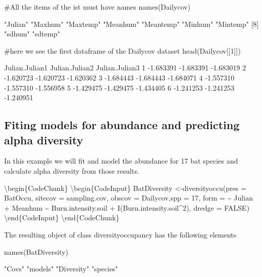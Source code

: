 \documentclass[article]{jss}
\begin{document}
\begin{CodeChunk}
\begin{CodeInput}
#All the items of the ist must have names
names(Dailycov)
\end{CodeInput}
\begin{CodeOutput}
[1] "Julian"   "Maxhum"   "Maxtemp"  "Meanhum"  "Meantemp" "Minhum"   "Mintemp" 
[8] "sdhum"    "sdtemp"  
\end{CodeOutput}
\begin{CodeInput}
#here we see the first dataframe of the Dailycov dataset
head(Dailycov[[1]])
\end{CodeInput}
\begin{CodeOutput}
  Julian.Julian1 Julian.Julian2 Julian.Julian3
1      -1.683391      -1.683391      -1.683019
2      -1.620723      -1.620723      -1.620362
3      -1.684443      -1.684443      -1.684071
4      -1.557310      -1.557310      -1.556958
5      -1.429475      -1.429475      -1.434405
6      -1.241253      -1.241253      -1.240951
\end{CodeOutput}
\end{CodeChunk}

\subsection{Fiting models for abundance and predicting alpha
diversity}\label{fiting-models-for-abundance-and-predicting-alpha-diversity}

In this example we will fit and model the abundance for 17 bat species
and calculate alpha diversity from those results.

\textbackslash{}begin\{CodeChunk\} \textbackslash{}begin\{CodeInput\}
BatDiversity \textless{}-diversityoccu(pres = BatOccu, sitecov =
sampling.cov, obscov = Dailycov,spp = 17, form = \textasciitilde{}
Julian + Meanhum \textasciitilde{} Burn.intensity.soil +
I(Burn.intensity.soil\^{}2), dredge = FALSE)
\textbackslash{}end\{CodeInput\} \textbackslash{}end\{CodeChunk\}

The resulting object of class diversityoccupancy has the following
elements

\begin{CodeChunk}
\begin{CodeInput}
names(BatDiversity)
\end{CodeInput}
\begin{CodeOutput}
[1] "Covs"      "models"    "Diversity" "species"  
\end{CodeOutput}
\end{CodeChunk}
\end{document}
